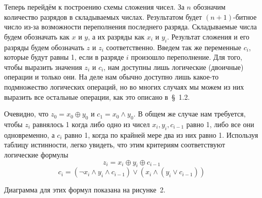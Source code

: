 Теперь перейдём к построению схемы сложения чисел. За $n$ обозначим количество разрядов в складываемых числах. Результатом будет $(n+1)$-битное число из-за возможности переполнения последнего разряда. Складываемые числа будем обозначать как $x$ и $y$, а их разряды как $x_i$ и $y_i$. Результат сложения и его разряды будем обозначать $z$ и $z_i$ соответственно. Введем так же переменные $c_i$, которые будут равны 1, если в разряде $i$ произошло переполнение. Для того, чтобы выразить значения $z_i$ и $c_i$, нам доступны лишь логические (двоичные) операции и только они. На деле нам обычно доступно лишь какое-то подмножество логических операций, но во многих случаях мы можем из них выразить все остальные операции, как это описано в~\S~1.2.

Очевидно, что $z_0 = x_0 \oplus y_0$ и $c_1 = x_0\land y_0$. В общем же случае нам требуется, чтобы $z_i$ равнялось 1 когда либо одно из чисел $x_i, y_i, c_{i-1}$ равно 1, либо все они одновременно, а $c_i$ равно 1, когда по крайней мере два из них равно 1. Используя таблицу истинности, легко увидеть, что этим критериям соответствуют логические формулы
$$z_i = x_i\oplus y_i \oplus c_{i-1}$$
$$c_i = (\neg x_i\land y_i \land c_{i-1}) \lor (x_i \land (y_i \lor c_{i-1}))$$

Диаграмма для этих формул показана на рисунке~2.

